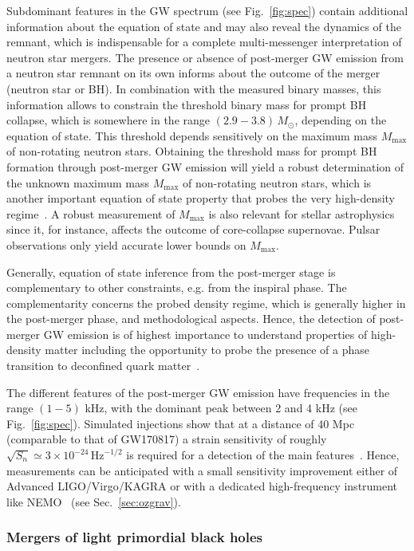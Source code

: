 \documentclass[11pt,a4paper]{article}
\begin{document}
Subdominant features in the GW spectrum (see Fig.~\ref{fig:spec}) contain additional information about the equation of state and may also reveal the dynamics of the remnant, which is indispensable for a complete multi-messenger interpretation of neutron star mergers.
The presence or absence of post-merger GW emission from a neutron star remnant on its own informs about the outcome of the merger (neutron star or BH). In combination with the measured binary masses, this information allows to constrain the threshold binary mass for prompt BH collapse, which is somewhere in the range $(2.9 - 3.8) \, M_\odot$, depending on the equation of state. This threshold depends sensitively on the maximum mass $M_\mathrm{max}$ of non-rotating neutron stars. Obtaining the threshold mass for prompt BH formation through post-merger GW emission will yield a robust determination of the unknown maximum mass $M_\mathrm{max}$ of non-rotating neutron stars, which is another important equation of state property that probes the very high-density regime~\cite{Bauswein2013}. A robust measurement of $M_\mathrm{max}$ is also relevant for stellar astrophysics since it, for instance, affects the outcome of core-collapse supernovae. Pulsar observations only yield accurate lower bounds on $M_\mathrm{max}$.

Generally, equation of state inference from the post-merger stage is complementary to other constraints, e.g. from the inspiral phase. The complementarity concerns the probed density regime, which is generally higher in the post-merger phase, and methodological aspects. Hence, the detection of post-merger GW emission is of highest importance to understand properties of high-density matter including the opportunity to probe the presence of a phase transition to deconfined quark matter~\cite{Most2019,Bauswein2019}.

The different features of the post-merger GW emission have frequencies in the range $(1 - 5)$ kHz, with the dominant peak between 2 and 4 kHz (see Fig.~\ref{fig:spec}). Simulated injections show that at a distance of 40 Mpc (comparable to that of GW170817) a strain sensitivity of roughly {$\sqrt{S_n} \simeq 3 \times 10^{-24} \, \text{Hz}^{-1/2}$} is required for a detection of the main features~\cite{Torres-Rivas2019}. Hence, measurements can be anticipated with a small sensitivity improvement either of Advanced LIGO/Virgo/KAGRA or with a dedicated high-frequency instrument like NEMO~\cite{ozhf} (see Sec.~\ref{sec:ozgrav}).

\subsubsection{Mergers of light primordial black holes}
\label{sec:PBHmergers}
\end{document}
